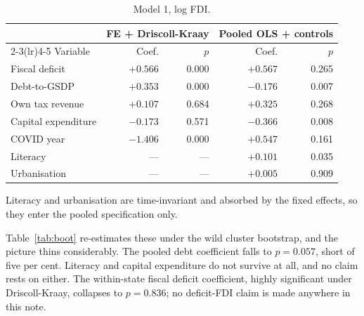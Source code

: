 \documentclass[12pt]{article}
\newcommand{\tnote}[1]{%
  \par\addvspace{4pt}%
  \begin{minipage}{0.92\textwidth}\footnotesize\raggedright #1\end{minipage}}
\begin{document}
\begin{table}[H]
\centering
\caption{Model 1, log FDI.}
\label{tab:m1}
\small
\begin{tabular}{@{}lrrrr@{}}
\toprule
& \multicolumn{2}{c}{FE + Driscoll-Kraay} & \multicolumn{2}{c}{Pooled OLS + controls} \\
\cmidrule(lr){2-3}\cmidrule(lr){4-5}
Variable & Coef. & $p$ & Coef. & $p$ \\
\midrule
Fiscal deficit      & $+0.566$ & 0.000 & $+0.567$ & 0.265 \\
Debt-to-GSDP        & $+0.353$ & 0.000 & $-0.176$ & 0.007 \\
Own tax revenue     & $+0.107$ & 0.684 & $+0.325$ & 0.268 \\
Capital expenditure & $-0.173$ & 0.571 & $-0.366$ & 0.008 \\
COVID year          & $-1.406$ & 0.000 & $+0.547$ & 0.161 \\
Literacy            & ---      & ---   & $+0.101$ & 0.035 \\
Urbanisation        & ---      & ---   & $+0.005$ & 0.909 \\
\bottomrule
\end{tabular}
\tnote{Literacy and urbanisation are time-invariant and absorbed by the fixed
effects, so they enter the pooled specification only.}
\end{table}

Table~\ref{tab:boot} re-estimates these under the wild cluster bootstrap, and the
picture thins considerably. The pooled debt coefficient falls to $p = 0.057$,
short of five per cent. Literacy and capital expenditure do not survive at all,
and no claim rests on either. The within-state fiscal deficit coefficient, highly
significant under Driscoll-Kraay, collapses to $p = 0.836$; no deficit-FDI claim
is made anywhere in this note.
\end{document}
